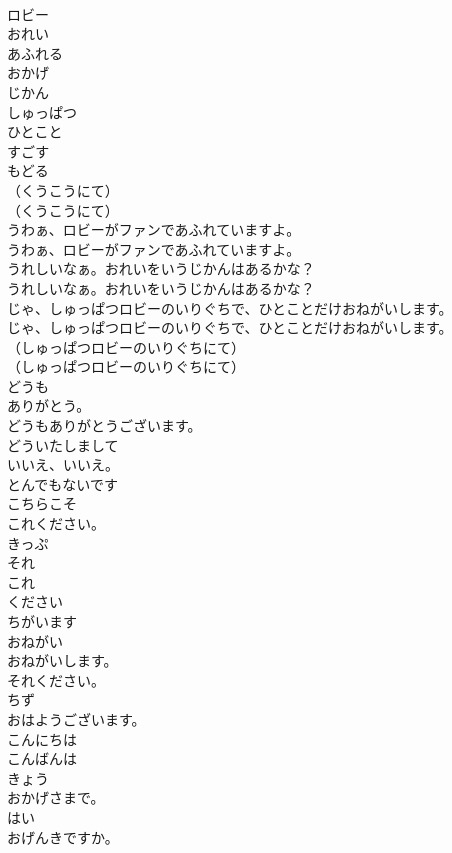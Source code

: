 \documentclass[8pt]{extreport}
\begin{document}
\begin{CJK}{UTF8}{min}
\\	ロビー
\\	おれい
\\	あふれる
\\	おかげ
\\	じかん
\\	しゅっぱつ
\\	ひとこと
\\	すごす
\\	もどる
\\	（くうこうにて）	
\\	（くうこうにて） 
\\	うわぁ、ロビーがファンであふれていますよ。	
\\	うわぁ、ロビーがファンであふれていますよ。 
\\	うれしいなぁ。おれいをいうじかんはあるかな？	
\\	うれしいなぁ。おれいをいうじかんはあるかな？ 
\\	じゃ、しゅっぱつロビーのいりぐちで、ひとことだけおねがいします。	
\\	じゃ、しゅっぱつロビーのいりぐちで、ひとことだけおねがいします。 
\\	（しゅっぱつロビーのいりぐちにて）	
\\	（しゅっぱつロビーのいりぐちにて） 
\\	どうも
\\	ありがとう。
\\	どうもありがとうございます。
\\	どういたしまして
\\	いいえ、いいえ。
\\	とんでもないです
\\	こちらこそ
\\	これください。
\\	きっぷ
\\	それ
\\	これ
\\	ください
\\	ちがいます
\\	おねがい
\\	おねがいします。
\\	それください。
\\	ちず
\\	おはようございます。
\\	こんにちは
\\	こんばんは
\\	きょう
\\	おかげさまで。
\\	はい
\\	おげんきですか。

\end{CJK}
\end{document}
